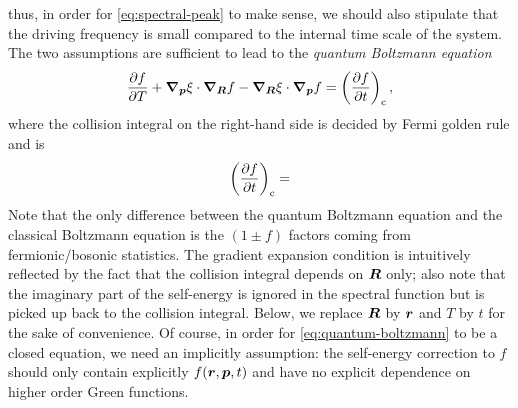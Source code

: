 \documentclass[hyperref, a4paper]{article}
\begin{document}
thus, in order for \eqref{eq:spectral-peak} to make sense, 
we should also stipulate that the driving frequency
is small compared to the internal time scale of the system.
The two assumptions are sufficient to lead to the \emph{quantum Boltzmann equation}
\begin{equation}
    \pdv{f}{T} + \grad_{\vb*{p}} \xi \cdot \grad_{\vb*{R}} f 
    - \grad_{\vb*{R}} \xi \cdot \grad_{\vb*{p}} f 
    = \left(\pdv{f}{t}\right)_{\text{c}}, 
    \label{eq:quantum-boltzmann}
\end{equation}
where the collision integral on the right-hand side is decided by Fermi golden rule 
and is 
\begin{equation}
    \left(\pdv{f}{t}\right)_{\text{c}} = 
\end{equation}
Note that the only difference between the quantum Boltzmann equation 
and the classical Boltzmann equation 
is the $(1 \pm f)$ factors coming from fermionic/bosonic statistics.
The gradient expansion condition is intuitively reflected 
by the fact that the collision integral depends on $\vb*{R}$ only;
also note that the imaginary part of the self-energy is ignored 
in the spectral function
but is picked up back to the collision integral.
Below, we replace $\vb*{R}$ by $\vb*{r}$ 
and $T$ by $t$
for the sake of convenience.
Of course, in order for \eqref{eq:quantum-boltzmann} to be a closed equation,
we need an implicitly assumption:
the self-energy correction to $f$ should only contain explicitly $f(\vb*{r}, \vb*{p}, t)$
and have no explicit dependence on higher order Green functions.
\end{document}
